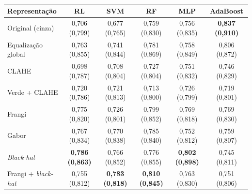 \begin{tabular}{lccccc}
\toprule
Representação & RL & SVM & RF & MLP & AdaBoost \\
\midrule
Original (cinza) & 0,706 (0,799) & 0,677 (0,765) & 0,759 (0,830) & 0,756 (0,835) & \textbf{0,837 (0,910)} \\
Equalização global & 0,763 (0,855) & 0,741 (0,844) & 0,781 (0,869) & 0,758 (0,849) & 0,806 (0,872) \\
CLAHE & 0,698 (0,787) & 0,708 (0,804) & 0,727 (0,804) & 0,751 (0,832) & 0,746 (0,829) \\
Verde + CLAHE & 0,720 (0,786) & 0,721 (0,813) & 0,713 (0,800) & 0,726 (0,799) & 0,719 (0,801) \\
\midrule
Frangi & 0,775 (0,820) & 0,726 (0,801) & 0,799 (0,852) & 0,769 (0,818) & 0,769 (0,830) \\
Gabor & 0,767 (0,834) & 0,770 (0,838) & 0,785 (0,840) & 0,752 (0,812) & 0,759 (0,807) \\
\textit{Black-hat} & \textbf{0,786 (0,863)} & 0,766 (0,852) & 0,776 (0,855) & \textbf{0,802 (0,898)} & 0,745 (0,811) \\
Frangi + \textit{black-hat} & 0,755 (0,812) & \textbf{0,783 (0,818)} & \textbf{0,810 (0,845)} & 0,763 (0,830) & 0,751 (0,806) \\
\bottomrule
\end{tabular}
